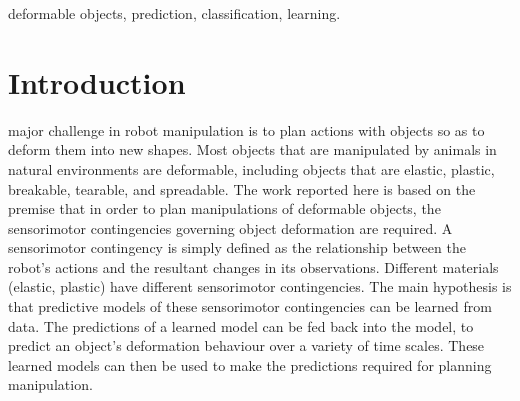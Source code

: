 \documentclass[journal]{IEEEtran}
\newcommand{\comment}[1]{{\color{red} #1}}
\begin{document}
\begin{IEEEkeywords}
deformable objects, prediction, classification, learning.
\end{IEEEkeywords}

%
\IEEEpeerreviewmaketitle



\section{Introduction}
% 
% 
% 
% 
 major challenge in robot manipulation is to plan actions with objects so as to deform them into new shapes. Most objects that are manipulated by animals in natural environments are deformable, including objects that are elastic, plastic, breakable, tearable, and spreadable. \comment{The work reported here is based on the premise that in order to plan manipulations of deformable objects, the sensorimotor contingencies governing object deformation are required. A sensorimotor contingency is simply defined as the relationship between the robot's actions and the resultant changes in its observations. Different materials (elastic, plastic) have different sensorimotor contingencies. The main hypothesis is that predictive models of these sensorimotor contingencies can be learned from data. The predictions of a learned model can be fed back into the model, to predict an object's deformation behaviour over a variety of time scales. These learned models can then be used to make the predictions required for planning manipulation.}
\end{document}
